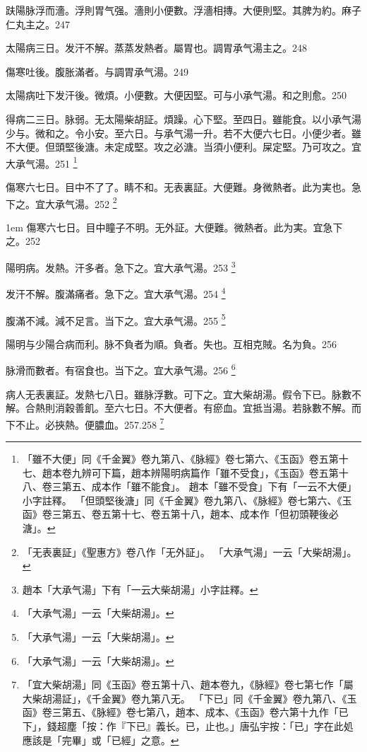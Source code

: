 趺陽脉浮而濇。浮則胃气强。濇則小便數。浮濇相摶。大便則堅。其脾为約。麻子仁丸主之。247

太陽病三日。发汗不解。蒸蒸发熱者。{\khaai 屬胃也。調胃}承气湯主之。248

傷寒吐後。腹{\khaai 胀}滿者。与{\khaai 調胃}承气湯。249

太陽病吐下发汗後。微煩。小便數。大便因堅。可与小承气湯。和之則愈。250

得病二三日。脉弱。无太陽柴胡証。煩躁。心下堅。至四日。雖能食。以{\khaai 小}承气湯少与。微和之。令小安。至六日。与承气湯一升。若不大便六七日。小便少者。雖不大便。但頭堅後溏。未定成堅。攻之必溏。当須小便利。屎定堅。乃可攻之。宜{\khaai 大}承气湯。251
	\footnote{
		「雖不大便」同《千金翼》卷九第八、《脉經》卷七第六、《玉函》卷五第十七、趙本卷九辨可下篇，趙本辨陽明病篇作「雖不受食」，《玉函》卷五第十八、卷三第五、成本作「雖不能食」。
		趙本「雖不受食」下有「一云不大便」小字註釋。
		「但頭堅後溏」同《千金翼》卷九第八、《脉經》卷七第六、《玉函》卷三第五、卷五第十七、卷五第十八，趙本、成本作「但初頭鞕後必溏」。
	}

傷寒六七日。目中不了了。睛不和。无表{\khaai 裏}証。大便難。身微熱者。此为実也。急下之。宜{\khaai 大}承气湯。252
	\footnote{
		「无表裏証」《聖惠方》卷八作「无外証」。
		「大承气湯」一云「大柴胡湯」。
	}

\hangindent 1em
傷寒六七日。目中瞳子不明。无外証。大便難。微熱者。此为実。宜急下之。{\shenghui}252

陽明病。发熱。汗多者。急下之。宜{\khaai 大}承气湯。253
	\footnote{
		趙本「大承气湯」下有「一云大柴胡湯」小字註釋。
	}

发汗不解。腹滿痛者。急下之。宜{\khaai 大}承气湯。254
	\footnote{
		「大承气湯」一云「大柴胡湯」。
	}

腹滿不減。減不足言。当下之。宜{\khaai 大}承气湯。255
	\footnote{
		「大承气湯」一云「大柴胡湯」。
	}

陽明与少陽合病而利。脉不負者为順。負者。失也。互相克賊。名为負。256

脉滑而數者。有宿食也。当下之。宜{\khaai 大}承气湯。256
	\footnote{
		「大承气湯」一云「大柴胡湯」。
	}

病人无表裏証。发熱七八日。雖脉浮數。可下之。{\khaai 宜大柴胡湯。}假令下已。脉數不解。合熱則消穀善飢。至六七日。不大便者。有瘀血。宜抵当湯。若脉數不解。而下不止。必挾熱。便膿血。257.258
	\footnote{
		「宜大柴胡湯」同《玉函》卷五第十八、趙本卷九，《脉經》卷七第七作「屬大柴胡湯証」，《千金翼》卷九第八无。
		「下已」同《千金翼》卷九第八、《玉函》卷三第五、《脉經》卷七第八，趙本、成本、《玉函》卷六第十九作「已下」，錢超塵「按：作『下已』義长。已，止也。」唐弘宇按：「已」字在此処應該是「完畢」或「已經」之意。
	}

